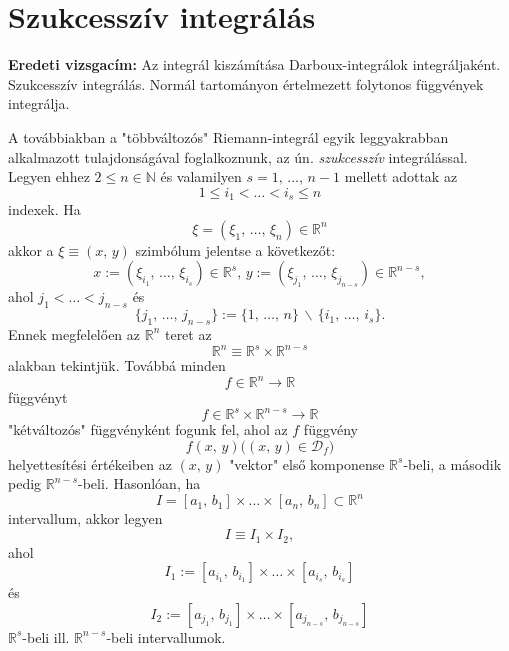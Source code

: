 \documentclass[12pt]{article}
\newcommand{\R}{\mathbb{R}}
\newcommand{\N}{\mathbb{N}}
\newcommand{\D}{\mathcal{D}_f}
\begin{document}
    \newpage
    \section{Szukcesszív integrálás}
    \textbf{Eredeti vizsgacím:}\newline
    Az integrál kiszámítása Darboux-integrálok integráljaként. Szukcesszív integrálás. Normál tartományon értelmezett folytonos függvények integrálja.\newline
    
    A továbbiakban a "többváltozós" Riemann-integrál egyik leggyakrabban alkalmazott tulajdonságával foglalkoznunk, az ún. \textit{szukcesszív} integrálással. Legyen ehhez $2 \leq n \in \N$ és valamilyen $s = 1, \, \dots, \, n - 1$ mellett adottak az
    \[
        1 \leq i_1 < \dots < i_{s} \leq n
    \]
    indexek. Ha 
    \[
        \xi = (\xi_1, \, \dots, \, \xi_n) \in \R^n
    \]
    akkor a  $\xi \equiv (x, \, y)$ szimbólum jelentse a következőt:
    \[
        x := (\xi_{i_1}, \, \dots, \, \xi_{i_s}) \in \R^s, \, y := (\xi_{j_1}, \, \dots, \, \xi_{j_{n-s}}) \in \R^{n-s},
    \]
    ahol $j_1 < \dots < j_{n-s}$ és
    \[
        \{ j_1, \, \dots, \,j_{n-s} \} := \{ 1, \, \dots, \, n \} \, \backslash \, \{i_1, \, \dots, \, i_s \}.
    \]
    Ennek megfelelően az $\R^n$ teret az
    \[
        \R^n \equiv \R^s \times \R^{n-s}
    \]
    alakban tekintjük. Továbbá minden
    \[
        f \in \R^n \to \R
    \]
    függvényt
    \[
        f \in \R^s \times \R^{n-s} \to \R
    \]
    "kétváltozós" függvényként fogunk fel, ahol az $f$ függvény
    \[
        f(x, \, y) \big( (x, \, y) \in \D \big)
    \]
    helyettesítési értékeiben az $(x, \, y)$ "vektor" első komponense $\R^s$-beli, a második pedig $\R^{n-s}$-beli. Hasonlóan, ha
    \[
        I = [a_1, \, b_1] \times \dots \times [a_n, \, b_n] \subset \R^n
    \]
    intervallum, akkor legyen
    \[
        I \equiv I_1 \times I_2,
    \]
    ahol
    \[
        I_1 := [a_{i_1}, \, b_{i_1}] \times \dots \times [a_{i_s}, \, b_{i_s}]
    \]
    és
    \[
        I_2 := [a_{j_1}, \, b_{j_1}] \times \dots \times [a_{j_{n-s}}, \, b_{j_{n-s}}]
    \]
    $\R^s$-beli ill. $\R^{n-s}$-beli intervallumok.\newline
\end{document}
